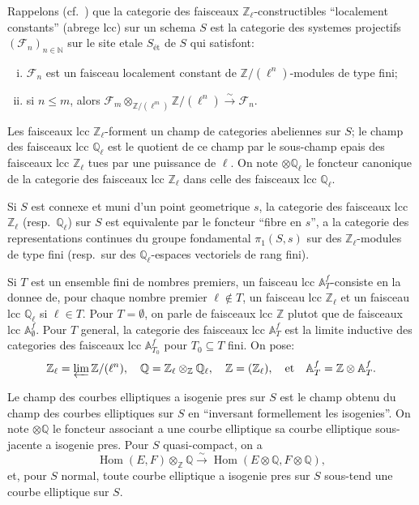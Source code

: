 \documentclass[11pt,reqno]{amsart}
\theoremstyle{plain}
\theoremstyle{remark}
\DeclareMathOperator{\Hom}{Hom}
\newcommand{\shF}{\mathcal{F}}
\newcommand{\Z}{\mathbb{Z}}
\newcommand{\Q}{\mathbb{Q}}
\newcommand{\A}{\mathbb{A}}
\newcommand{\N}{\mathbb{N}}
\newcommand{\isom}{\xrightarrow{\sim}}
\numberwithin{equation}{section}
\begin{document}
Rappelons (cf.~\cite{Jouanolou}) que la categorie des faisceaux $\Z_\ell$-constructibles ``localement constants'' (abrege lcc) sur un schema $S$ est la categorie des systemes projectifs $(\shF_n)_{n \in \N}$ sur le site etale $S_{\text{\'et}}$ de $S$ qui satisfont:
\begin{enumerate}[(i)]
\item $\shF_n$ est un faisceau localement constant de $\Z/(\ell^n)$-modules de type fini;
\item si $n \leq m$, alors $\shF_m \otimes_{\Z/(\ell^m)} \Z/(\ell^n) \isom \shF_n$.
\end{enumerate}
Les faisceaux lcc $\Z_\ell$-forment un champ de categories abeliennes sur $S$; le champ des faisceaux lcc $\Q_\ell$ est le quotient de ce champ par le sous-champ epais des faisceaux lcc $\Z_\ell$ tues par une puissance de $\ell$. On note $\otimes \Q_\ell$ le foncteur canonique de la categorie des faisceaux lcc $\Z_\ell$ dans celle des faisceaux lcc $\Q_\ell$.

Si $S$ est connexe et muni d'un point geometrique $s$, la categorie des faisceaux lcc $\Z_\ell$ (resp.~$\Q_\ell$) sur $S$ est equivalente par le foncteur ``fibre en $s$'', a la categorie des representations continues du groupe fondamental $\pi_1(S, s)$ sur des $\Z_\ell$-modules de type fini (resp.~sur des $\Q_\ell$-espaces vectoriels de rang fini).

Si $T$ est un ensemble fini de nombres premiers, un faisceau lcc $\A_T^f$-consiste en la donnee de, pour chaque nombre premier $\ell \not\in T$, un faisceau lcc $\Z_\ell$ et un faisceau lcc $\Q_\ell$ si $\ell \in T$. Pour $T = \emptyset$, on parle de faisceaux lcc $\Z$ plutot que de faisceaux lcc $\A_\emptyset^f$. Pour $T$ general, la categorie des faisceaux lcc $\A_T^f$ est la limite inductive des categories des faisceaux lcc $\A_{T_0}^f$ pour $T_0 \subseteq T$ fini. On pose:
\[
\Z_\ell = \varprojlim \Z/(\ell^n), \quad \Q = \Z_\ell \otimes_\Z \Q_\ell, \quad \Z = (\Z_\ell), \quad \text{et} \quad \A_T^f = \Z \otimes \A_T^f.
\]

Le champ des courbes elliptiques a isogenie pres sur $S$ est le champ obtenu du champ des courbes elliptiques sur $S$ en ``inversant formellement les isogenies''. On note $\otimes \Q$ le foncteur associant a une courbe elliptique sa courbe elliptique sous-jacente a isogenie pres. Pour $S$ quasi-compact, on a
\[
\Hom(E, F) \otimes_\Z \Q \isom \Hom(E \otimes \Q, F \otimes \Q),
\]
et, pour $S$ normal, toute courbe elliptique a isogenie pres sur $S$ sous-tend une courbe elliptique sur $S$.
\end{document}

